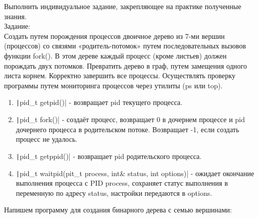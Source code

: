 \documentclass[a4paper,14pt]{extarticle}
\begin{document}
    Выполнить индивидуальное задание, закрепляющее на практике полученные знания.\\ 
    Задание:\\
    Создать путем порождения процессов двоичное дерево из 7-ми вершин (процессов) со
    связями «родитель-потомок» путем последовательных вызовов функции fork(). В этом дереве
    каждый процесс (кроме листьев) должен порождать двух потомков. Превратить дерево в граф,
    путем замещения одного листа корнем. Корректно завершить все процессы. Осуществлять
    проверку программы путем мониторинга процессов через утилиты (ps или top).\\
    \begin{enumerate}[1.]
        \item \texttt|pid_t getpid()| - возвращает pid текущего процесса.
        \item \texttt|pid_t fork()| - создаёт процесс, возвращает 0 в дочернем процессе и pid дочернего процесса в родительском потоке. Возвращает -1, если создать процесс не удалось.
        \item \texttt|pid_t getppid()| - возвращает pid родительского процесса.
        \item \texttt|pid_t waitpid(pit_t process, int& status, int options)| - ожидает окончание выполнения процесса с PID process, сохраняет статус выполнения в переменную по адресу status, настройки передаются в options.
    \end{enumerate}
          Напишем программу для создания бинарного дерева с семью вершинами:
\end{document}
